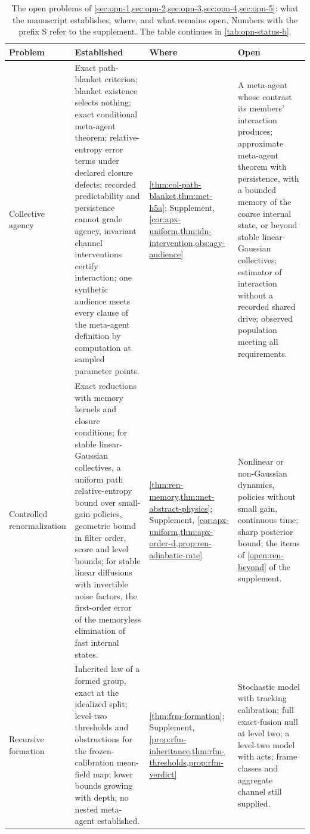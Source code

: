 \begin{table}[p]
\centering
\small
\caption{The open problems of \cref{sec:opn-1,sec:opn-2,sec:opn-3,sec:opn-4,sec:opn-5}: what the manuscript establishes, where, and what remains open. Numbers with the prefix S refer to the supplement. The table continues in \cref{tab:opn-status-b}.}
\label{tab:opn-status}
\begin{tabular}{@{}>{\raggedright\arraybackslash}p{}>{\raggedright\arraybackslash}p{}>{\raggedright\arraybackslash}p{}>{\raggedright\arraybackslash}p{}@{}}
\toprule
Problem & Established & Where & Open \\
\midrule
Collective agency & Exact path-blanket criterion; blanket existence selects nothing; exact conditional meta-agent theorem; relative-entropy error terms under declared closure defects; recorded predictability and persistence cannot grade agency, invariant channel interventions certify interaction; one synthetic audience meets every clause of the meta-agent definition by computation at sampled parameter points. & \cref{thm:col-path-blanket,thm:met-h5a}; Supplement, \cref{cor:apx-uniform,thm:idn-intervention,obs:agy-audience} & A meta-agent whose contrast its members' interaction produces; approximate meta-agent theorem with persistence, with a bounded memory of the coarse internal state, or beyond stable linear-Gaussian collectives; estimator of interaction without a recorded shared drive; observed population meeting all requirements. \\
\addlinespace
Controlled renormalization & Exact reductions with memory kernels and closure conditions; for stable linear-Gaussian collectives, a uniform path relative-entropy bound over small-gain policies, geometric bound in filter order, score and level bounds; for stable linear diffusions with invertible noise factors, the first-order error of the memoryless elimination of fast internal states. & \cref{thm:ren-memory,thm:met-abstract-physics}; Supplement, \cref{cor:apx-uniform,thm:apx-order-d,prop:ren-adiabatic-rate} & Nonlinear or non-Gaussian dynamics, policies without small gain, continuous time; sharp posterior bound; the items of \cref{open:ren-beyond} of the supplement. \\
\addlinespace
Recursive formation & Inherited law of a formed group, exact at the idealized split; level-two thresholds and obstructions for the frozen-calibration mean-field map; lower bounds growing with depth; no nested meta-agent established. & \cref{thm:frm-formation}; Supplement, \cref{prop:rfm-inheritance,thm:rfm-thresholds,prop:rfm-verdict} & Stochastic model with tracking calibration; full exact-fusion null at level two; a level-two model with acts; frame classes and aggregate channel still supplied. \\

\end{tabular}
\end{table}
